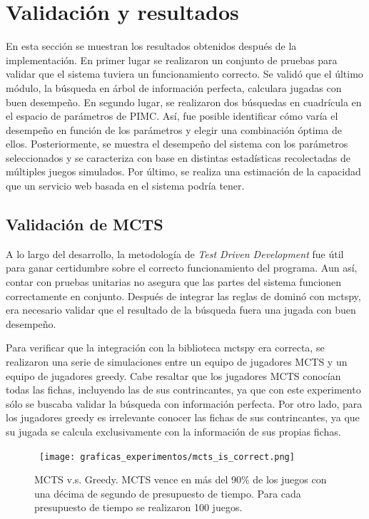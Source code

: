 \chapter{Validación y resultados}

\noindent
En esta sección se muestran los resultados obtenidos después de la
implementación. En primer lugar se realizaron un conjunto de pruebas para
validar que el sistema tuviera un funcionamiento correcto. Se validó que el
último módulo, la búsqueda en árbol de información perfecta, calculara jugadas
con buen desempeño. En segundo lugar, se realizaron dos búsquedas en cuadrícula
en el espacio de parámetros de PIMC. Así, fue posible identificar cómo varía el
desempeño en función de los parámetros y elegir una combinación óptima de ellos.
Posteriormente, se muestra el desempeño del sistema con los parámetros
seleccionados y se caracteriza con base en distintas estadísticas recolectadas
de múltiples juegos simulados. Por último, se realiza una estimación de la
capacidad que un servicio web basada en el sistema podría tener.

\section{Validación de MCTS}

A lo largo del desarrollo, la metodología de  \textit{Test Driven Development}
fue útil para ganar certidumbre sobre el correcto funcionamiento del programa.
Aun así, contar con pruebas unitarias no asegura que las partes del sistema
funcionen correctamente en conjunto. Después de integrar las reglas de dominó
con mctspy, era necesario validar que el resultado de la búsqueda fuera una jugada
con buen desempeño.

Para verificar que la integración con la biblioteca mctspy era correcta, se
realizaron una serie de simulaciones entre un equipo de jugadores MCTS y un
equipo de jugadores greedy. Cabe resaltar que los jugadores MCTS conocían todas
las fichas, incluyendo las de sus contrincantes, ya que con este experimento
sólo se buscaba validar la búsqueda con información perfecta. Por otro lado,
para los jugadores greedy es irrelevante conocer las fichas de sus
contrincantes, ya que su jugada se calcula exclusivamente con la información de
sus propias fichas.

\begin{figure}[H]
    \begin{center}
        \hbox{\hspace{-2em}
        \texttt{[image: graficas\_experimentos/mcts\_is\_correct.png]}}
        \caption{MCTS v.s. Greedy. MCTS vence en más del 90\% de los juegos con
        una décima de segundo de presupuesto de tiempo. Para cada presupuesto de
        tiempo se realizaron 100 juegos.}
        \label{MGA}
    \end{center}
\end{figure}

